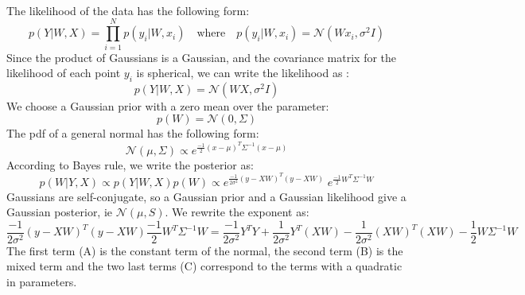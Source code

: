 \documentclass[a4paper,11pt]{article}
\theoremstyle{mytheor}
\begin{document}
\smallskip
\\\\
\smallskip
\\The likelihood of the data has the following form:
\begin{equation*}
p \left({Y|W, X} \right) = \prod\limits_{i=1}^{N} p \left(y_{i}|W,x_{i}\right) \quad \text{where} \quad p \left(y_{i}|W,x_{i}\right) = \mathcal{N}(W x_i, \sigma^2I) 
\end{equation*}
Since the product of Gaussians is a Gaussian, and the covariance matrix for the likelihood of each point $y_i$ is spherical, we can write the likelihood as :
\begin{equation*}
p \left({Y|W, X} \right) = \mathcal{N}(WX, \sigma^2I)
\end{equation*}
We choose a Gaussian prior with a zero mean over the parameter:
\begin{equation*}
p \left(W\right) = \mathcal{N}(0, \Sigma)
\end{equation*}
The pdf of a general normal has the following form:
\begin{equation*}
\mathcal{N}(\mu, \Sigma) \propto e^{\frac{-1}{2}(x-\mu)^T\Sigma^{-1}(x-\mu)}
\end{equation*}
According to Bayes rule, we write the posterior as: 
\begin{equation*}
p(W|Y,X) \propto p(Y|W,X) p(W)
    \propto e^{\frac{-1}{2\sigma^2} (y-XW)^T(y-XW)}\; e^{\frac{-1}{2}W^T\Sigma^{-1}W}
\end{equation*}
Gaussians are self-conjugate, so a Gaussian prior and a Gaussian likelihood give a Gaussian posterior, ie $\mathcal{N}(\mu, S)$. We rewrite the exponent as:
\begin{equation*}
\frac{-1}{2\sigma^2} (y-XW)^T(y-XW)\frac{-1}{2}W^T\Sigma^{-1}W
=\frac{-1}{2\sigma^2} Y^TY + \frac{1}{2\sigma^2}Y^T(XW)-\frac{1}{2\sigma^2}(XW)^T(XW)-\frac{1}{2}W\Sigma^{-1}W
\end{equation*}
The first term (A) is the constant term of the normal, the second term (B) is the mixed term and the two last terms (C) correspond to the terms with a quadratic in parameters.\\
\end{document}
